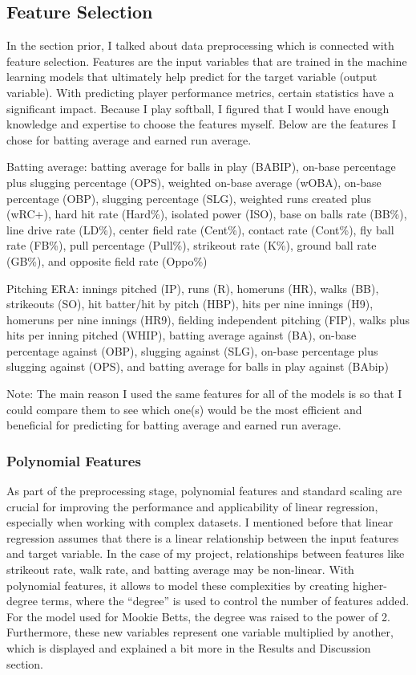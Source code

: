 \documentclass[10pt,twocolumn]{article}
\begin{document}
\subsection{Feature Selection}

In the section prior, I talked about data preprocessing which is connected with feature selection. Features are the input variables that are trained in the machine learning models that ultimately help predict for the target variable (output variable). With predicting player performance metrics, certain statistics have a significant impact. Because I play softball, I figured that I would have enough knowledge and expertise to choose the features myself. Below are the features I chose for batting average and earned run average. 

Batting average: batting average for balls in play (BABIP), on-base percentage plus slugging percentage (OPS), weighted on-base average (wOBA), on-base percentage (OBP), slugging percentage (SLG), weighted runs created plus (wRC+), hard hit rate (Hard\%), isolated power (ISO), base on balls rate (BB\%), line drive rate (LD\%), center field rate (Cent\%), contact rate (Cont\%), fly ball rate (FB\%), pull percentage (Pull\%), strikeout rate (K\%), ground ball rate (GB\%), and opposite field rate (Oppo\%)

Pitching ERA: innings pitched (IP), runs (R), homeruns (HR), walks (BB), strikeouts (SO), hit batter/hit by pitch (HBP), hits per nine innings (H9), homeruns per nine innings (HR9), fielding independent pitching (FIP), walks plus hits per inning pitched (WHIP), batting average against (BA), on-base percentage against (OBP), slugging against (SLG), on-base percentage plus slugging against (OPS), and batting average for balls in play against (BAbip) 

Note: The main reason I used the same features for all of the models is so that I could compare them to see which one(s) would be the most efficient and beneficial for predicting for batting average and earned run average.

\subsubsection{Polynomial Features}

As part of the preprocessing stage, polynomial features and standard scaling are crucial for improving the performance and applicability of linear regression, especially when working with complex datasets. I mentioned before that linear regression assumes that there is a linear relationship between the input features and target variable. In the case of my project, relationships between features like strikeout rate, walk rate, and batting average may be non-linear. With polynomial features, it allows to model these complexities by creating higher-degree terms, where the “degree” is used to control the number of features added\cite{15}. For the model used for Mookie Betts, the degree was raised to the power of 2. Furthermore, these new variables represent one variable multiplied by another, which is displayed and explained a bit more in the Results and Discussion section.  
\end{document}
